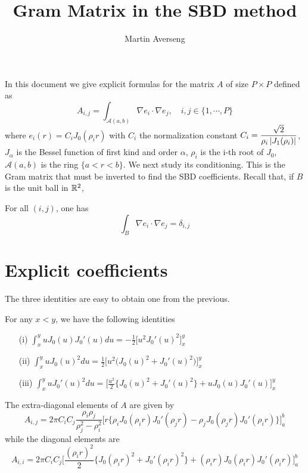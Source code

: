 \documentclass[11pt,a4paper]{article}
\author{Martin Averseng}
\title{Gram Matrix in the SBD method}
\begin{document}
\maketitle
\noindent In this document we give explicit formulas for the matrix $A$ of size $P \times P$ defined as 
\[A_{i,j} = \int_{\mathcal{A}(a,b)} \nabla e_i \cdot \nabla e_j, \quad i,j \in \{1,\cdots,P\}\]
where $e_i(r) = C_i J_0(\rho_i r)$ with $C_i$ the normalization constant $C_i = \dfrac{\sqrt{2}}{\rho_i \left\lvert J_1(\rho_i) \right\rvert}$, $J_\alpha$ is the Bessel function of first kind and order $\alpha$, $\rho_i$ is the i-th root of $J_0$, $\mathcal{A}(a,b)$ is the ring $\{a < r < b\}$. We next study its conditioning. 
This is the Gram matrix that must be inverted to find the SBD coefficients. 
Recall that, if $B$ is the unit ball in $\mathbb{R}^2$,
\begin{The}
	For all $(i,j)$, one has
	\[ \int_B \nabla e_i \cdot \nabla e_j = \delta_{i,j}\] 
\end{The}
\section{Explicit coefficients}
\begin{center}
	
\end{center} The three identities are easy to obtain one from the previous. 	
\begin{Prop}
	For any $x<y$, we have the following identities
	\begin{itemize}
		\item[(i)] $\displaystyle \int_{x}^y u J_0(u) J_0'(u) du = -\frac{1}{2} \bigg[ u^2 J_0'(u)^2\bigg]_x^y$
		\item[(ii)] $\displaystyle \int_{x}^y u J_0(u)^2 du = \frac{1}{2}\bigg[{u^2}\big(J_0(u)^2 + J_0'(u) ^2\big) \bigg]_x^y$
		\item[(iii)] $\displaystyle \int_x^y u J_0'(u)^2 du = \bigg[\frac{u^2}{2} \big\{J_0(u)^2 + J_0'(u)^2\big\} + u J_0(u) J_0'(u)\bigg]_x^y$
	\end{itemize}
\end{Prop}	
\begin{The}
	The extra-diagonal elements of $A$ are given by 
	\begin{equation*}
		A_{i,j} = 2 \pi  C_i C_j \dfrac{\rho_i \rho_j}{\rho_j^2 - \rho_i^2} \bigg[r \big\{\rho_i J_0(\rho_i r) J_0'(\rho_jr) - \rho_j J_0(\rho_j r) J_0'(\rho_i r)\big\}\bigg]_a^b
	\end{equation*}
	while the diagonal elements are
	\begin{equation*}
		A_{i,i} = 2\pi C_i C_j \bigg[\frac{(\rho_i r)^2}{2}\big\{J_0(\rho_i r)^2 + J_0'(\rho_i r)^2\big\} + (\rho_i r) J_0(\rho_i r)J_0'(\rho_i r)\bigg]_a^b
	\end{equation*}
\end{The}
\end{document}
